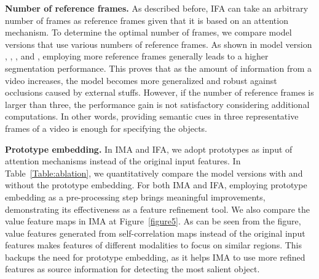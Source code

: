 \documentclass[10pt,twocolumn,letterpaper]{article}
\begin{document}
\vspace{1mm}
\noindent\textbf{Number of reference frames.} As described before, IFA can take an arbitrary number of frames as reference frames given that it is based on an attention mechanism. To determine the optimal number of frames, we compare model versions that use various numbers of reference frames. As shown in model version , , , and , employing more reference frames generally leads to a higher segmentation performance. This proves that as the amount of information from a video increases, the model becomes more generalized and robust against occlusions caused by external stuffs. However, if the number of reference frames is larger than three, the performance gain is not satisfactory considering additional computations. In other words, providing semantic cues in three representative frames of a video is enough for specifying the objects.


\vspace{1mm}
\noindent\textbf{Prototype embedding.} In IMA and IFA, we adopt prototypes as input of attention mechanisms instead of the original input features. In Table~\ref{Table:ablation}, we quantitatively compare the model versions with and without the prototype embedding. For both IMA and IFA, employing prototype embedding as a pre-processing step brings meaningful improvements, demonstrating its effectiveness as a feature refinement tool. We also compare the value feature maps in IMA at Figure~\ref{figure5}. As can be seen from the figure, value features generated from self-correlation maps instead of the original input features makes features of different modalities to focus on similar regions. This backups the need for prototype embedding, as it helps IMA to use more refined features as source information for detecting the most salient object.
\end{document}
